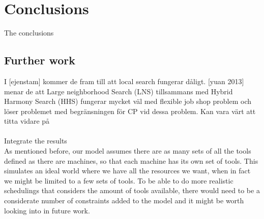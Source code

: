 \chapter{Conclusions} \label{cha:conc}
The conclusions

\section{Further work}
I [ejenstam] kommer de fram till att local search fungerar dåligt.\cite{ejenstam_2014} [yuan 2013] menar de att Large neighborhood Search (LNS) tillsammans med Hybrid Harmony Search (HHS) fungerar mycket väl med flexible job shop problem och löser problemet med begränsningen för CP vid dessa problem.\cite{yuan_2013} Kan vara värt att titta vidare på
\\\\
\cite{Bjordal} Integrate the results
\\
As mentioned before, our model assumes there are as many sets of all the tools defined as there are machines, so that each machine has its own set of tools. This simulates an ideal world where we have all the resources we want, when in fact we might be limited to a few sets of tools. To be able to do more realistic schedulings that considers the amount of tools available, there would need to be a considerate number of constraints added to the model and it might be worth looking into in future work.
